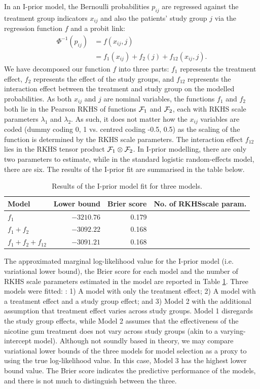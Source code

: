 \documentclass[a4paper,showframe,11pt]{report}\usepackage[]{graphicx}\usepackage[]{color}
\begin{document}
In an I-prior model, the Bernoulli probabilities $p_{ij}$ are regressed against the treatment group indicators $x_{ij}$ and also the patients' study group $j$ via the regression function $f$ and a probit link:
\begin{align*}
  \Phi^{-1}(p_{ij})
  &= f(x_{ij}, j) \\
  &= f_1(x_{ij}) + f_2(j) + f_{12}(x_{ij}, j).
\end{align*}
We have decomposed our function $f$ into three parts: $f_1$ represents the treatment effect, $f_2$ represents the effect of the study groups, and $f_{12}$ represents the interaction effect between the treatment and study group on the modelled probabilities.
As both $x_{ij}$ and $j$ are nominal variables, the functions $f_1$ and $f_2$ both lie in the Pearson RKHS of functions ${\mathcal F}_1$ and ${\mathcal F}_2$, each with RKHS scale parameters $\lambda_1$ and $\lambda_2$.
As such, it does not matter how the $x_{ij}$ variables are coded (dummy coding 0, 1 vs. centred coding -0.5, 0.5) as the scaling of the function is determined by the RKHS scale parameters.
The interaction effect $f_{12}$ lies in the RKHS tensor product ${\mathcal F}_1 \otimes {\mathcal F}_2$.
In I-prior modelling, there are only two parameters to estimate, while in the standard logistic random-effects model, there are six. The results of the I-prior fit are summarised in the table below.


\begin{longtable}[t]{lrr>{\raggedleft\arraybackslash}p{2.4cm}}
\caption{\label{tab:mod.compare.smoke}Results of the I-prior model fit for three models.}\\
\toprule
Model & Lower bound & Brier score & No. of RKHS\newline scale param.\\
\midrule
$f_1$ & $-3210.76$ & 0.179 & 1\\
$f_1 + f_2$ & $-3092.22$ & 0.168 & 2\\
$f_1 + f_2 + f_{12}$ & $-3091.21$ & 0.168 & 2\\
\bottomrule
\end{longtable}



The approximated marginal log-likelihood value for the I-prior model (i.e. variational lower bound), the Brier score for each model and the number of RKHS scale parameters estimated in the model are reported in Table \ref{tab:mod.compare.smoke}. Three models were fitted: : 1) A model with only the treatment effect; 2) A model with a treatment effect and a study group effect; and 3) Model 2 with the additional assumption that treatment effect varies across study groups. Model 1 disregards the study group effects, while Model 2 assumes that the effectiveness of the nicotine gum treatment does not vary across study groups (akin to a varying-intercept model). Although not soundly based in theory, we may compare variational lower bounds of the three models for model selection as a proxy to using the true log-likelihood value. In this case, Model 3 has the highest lower bound value. The Brier score indicates the predictive performance of the models, and there is not much to distinguish between the three.
\end{document}
